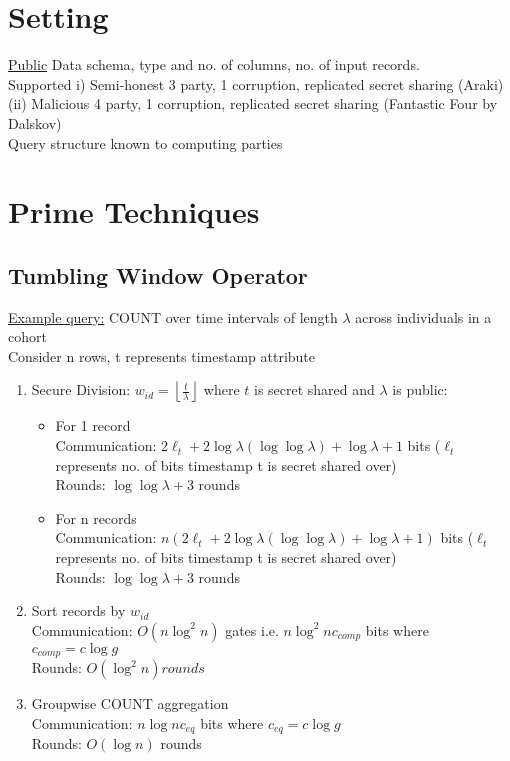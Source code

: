 \documentclass{article}
\begin{document}
\section{Setting}
\textbullet{} \underline{Public} Data schema, type and no. of columns, no. of input records. \\
\textbullet{} Supported i) Semi-honest 3 party, 1 corruption, replicated secret sharing (Araki) (ii) Malicious 4 party, 1 corruption, replicated secret sharing (Fantastic Four by Dalskov) \\
\textbullet{} Query structure known to computing parties  

\section{Prime Techniques}

\subsection{Tumbling Window Operator}
\underline{Example query:} COUNT over time intervals of length $\lambda$ across individuals in a cohort \\
Consider n rows, t represents timestamp attribute 
\begin{enumerate}
\item Secure Division: $w_{id} = \left\lfloor \frac{t}{\lambda} \right\rfloor$ where $t$ is secret shared and $\lambda$ is public:
\begin{itemize}
\item For 1 record \\
Communication: $2\ell_{t} + 2\log \lambda (\log \log \lambda) + \log \lambda + 1$ bits ($\ell_{t}$ represents no. of bits timestamp t is secret shared over) \\
Rounds: $\log \log \lambda + 3$ rounds
\item For n records \\
Communication: $n(2\ell_{t} + 2\log \lambda (\log \log \lambda) + \log \lambda + 1)$ bits ($\ell_{t}$ represents no. of bits timestamp t is secret shared over) \\
Rounds: $\log \log \lambda + 3$ rounds
\end{itemize}
\item Sort records by $w_{id}$ \\
Communication: $O(n \log^2 n)$ gates i.e. $n \log^2 n c_{comp}$ bits where $c_{comp} = c \log g$ \\
Rounds: $O(\log^2 n) rounds$
\item Groupwise COUNT aggregation  \\
Communication: $n \log n c_{eq}$ bits where $c_{eq} = c \log g$ \\
Rounds: $O(\log n)$ rounds
\end{enumerate}
\end{document}
